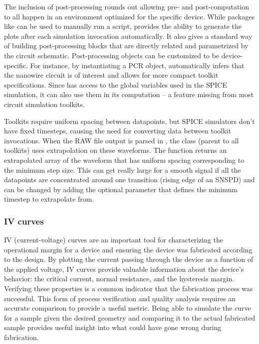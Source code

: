 The inclusion of post-processing rounds out  allowing pre- and post-computation
to all happen in an environment optimized for the specific device. While
packages like  can be used to manually 
run a script, 
provides the ability to generate the plots after each simulation invocation automatically.
It also gives a standard way of building post-processing blocks that are directly related
and parametrized by the circuit schematic. 
Post-processing objects can be customized to be device-specific.
For instance, by instantiating a PCR object,  automatically infers that 
the nanowire circuit is of interest and allows for more compact toolkit specifications.
Since  has access to the global
variables used in the SPICE simulation, it can also use them in its computation -- a feature
missing from most circuit simulation toolkits.

Toolkits require uniform spacing between datapoints, but SPICE simulators don't have fixed timesteps, 
causing the need for converting data between toolkit invocations. When the RAW file output is parsed
in , the  class (parent to all toolkits) uses extrapolation on these
waveforms. The function  returns an extrapolated  
array of the waveform that has uniform spacing corresponding to the minimum step size. This can
get really large for a smooth signal if all the datapoints are concentrated around one transition
(rising edge of an SNSPD) and can be changed by adding the optional parameter  that defines 
the minimum timestep to extrapolate from.

\subsubsection{IV curves}

IV (current-voltage) curves are an important tool for characterizing the operational margin for a device and ensuring the device was fabricated according to the design. By plotting the current passing through the device as a function of the applied voltage, 
IV curves provide valuable information about the device's behavior: the critical current, 
normal resistance, and the hysteresis margin. Verifying these properties is a common 
indicator that the fabrication process was successful. 
This form of process verification and quality analysis requires an accurate
comparison to provide a useful metric. Being able to simulate the curve for a sample given the desired geometry and comparing
it to the actual fabricated sample provides useful insight into what could have gone wrong during fabrication. 

